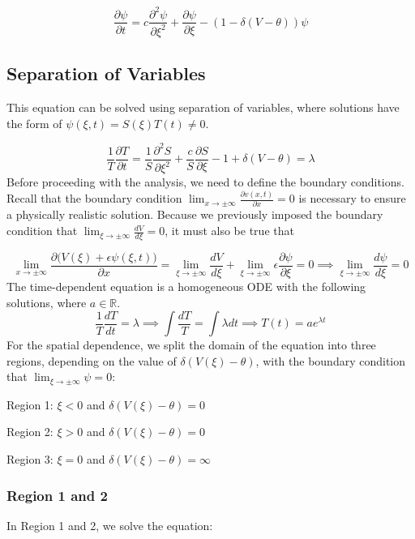 \documentclass[12pt]{article}
\begin{document}
\begin{equation} \label{pde_nh}
\frac{\partial \psi}{\partial t} = c \frac{\partial^2\psi}{\partial\xi^2} + \frac{\partial\psi}{\partial\xi} - (1 - \delta(V-\theta))\psi
\end{equation} 


\subsection{Separation of Variables}

This equation can be solved using separation of variables, where solutions have the form of $\psi(\xi,t)=S(\xi)T(t)\neq0$.

$$ \frac{1}{T}\frac{\partial T}{\partial t} = \frac{1}{S}\frac{\partial^2S}{\partial\xi^2} + \frac{c}{S}\frac{\partial S}{\partial\xi} - 1 + \delta(V-\theta)= \lambda $$
Before proceeding with the analysis, we need to define the boundary conditions. Recall that the boundary condition $\lim_{x\to\pm\infty} \frac{\partial v(x,t)}{\partial x}=0$ is necessary to ensure a physically realistic solution. Because we previously imposed the boundary condition that $\lim_{\xi\to\pm\infty} \frac{dV}{d\xi}=0$, it must also be true that 

$$\lim_{x\to\pm\infty} \frac{\partial \big(V(\xi)+\epsilon\psi(\xi,t)\big)}{\partial x} = \lim_{\xi\to\pm\infty} \frac{dV}{d\xi}+\lim_{\xi\to\pm\infty} \epsilon\frac{\partial\psi}{\partial\xi}=0 \implies \lim_{\xi\to\pm\infty}\frac{d\psi}{d\xi}=0 $$
The time-dependent equation is a homogeneous ODE with the following solutions, where $a\in\mathbb{R}$.
\begin{equation} \label{timeeq}
\frac{1}{T}\frac{dT}{dt} = \lambda \implies \int\frac{dT}{T} = \int\lambda dt \implies T(t)=ae^{\lambda t}
\end{equation}
For the spatial dependence, we split the domain of the equation into three regions, depending on the value of $\delta(V(\xi)-\theta)$, with the boundary condition that $\lim_{\xi \to \pm \infty}\psi = 0$:

Region 1: $\xi < 0$ and $\delta(V(\xi)-\theta) = 0$

Region 2: $\xi > 0$ and $\delta(V(\xi)-\theta) = 0$ 

Region 3: $\xi = 0$ and $\delta(V(\xi)-\theta) = \infty$

\subsubsection{ Region 1 and 2}
In Region 1 and 2, we solve the equation:
\end{document}
